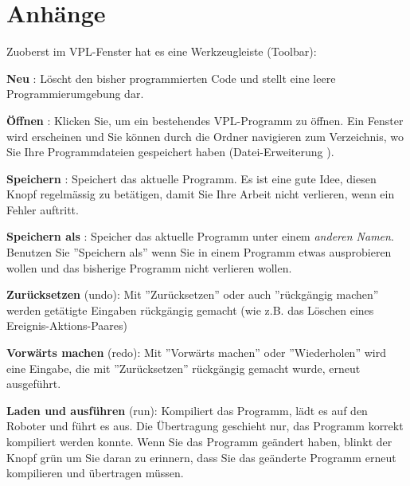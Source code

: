 \part{Anhänge}

\label{a.toolbar}

Zuoberst im VPL-Fenster hat es eine Werkzeugleiste (Toolbar):

\begin{center}
\end{center}

\bigskip

\textbf{Neu} : Löscht den bisher programmierten Code und stellt eine leere Programmierumgebung dar.

\bigskip

\textbf{Öffnen} : Klicken Sie, um ein bestehendes VPL-Programm zu öffnen. Ein Fenster wird erscheinen und Sie können durch die Ordner navigieren zum Verzeichnis, wo Sie Ihre Programmdateien gespeichert haben (Datei-Erweiterung ).

\bigskip

\textbf{Speichern} : Speichert das aktuelle Programm. Es ist eine gute Idee, diesen Knopf regelmässig zu betätigen, damit Sie Ihre Arbeit nicht verlieren, wenn ein Fehler auftritt. 

\bigskip

\textbf{Speichern als} : Speicher das aktuelle Programm unter einem \emph{anderen Namen}. Benutzen Sie ''Speichern als'' wenn Sie in einem Programm etwas ausprobieren wollen und das bisherige Programm nicht verlieren wollen. 

\bigskip

\textbf{Zurücksetzen}  (undo): Mit ''Zurücksetzen'' oder auch ''rückgängig machen'' werden getätigte Eingaben rückgängig gemacht (wie z.B. das Löschen eines Ereignis-Aktions-Paares)\label{p.undo}

\bigskip

\textbf{Vorwärts machen}  (redo): Mit ''Vorwärts machen'' oder ''Wiederholen'' wird eine Eingabe, die mit ''Zurücksetzen'' rückgängig gemacht wurde, erneut ausgeführt. 

\bigskip

\textbf{Laden und ausführen}  (run): Kompiliert das Programm, lädt es auf den Roboter und führt es aus. Die Übertragung geschieht nur, das Programm korrekt kompiliert werden konnte. Wenn Sie das Programm geändert haben, blinkt der Knopf grün um Sie daran zu erinnern, dass Sie das geänderte Programm erneut kompilieren und übertragen müssen. 

